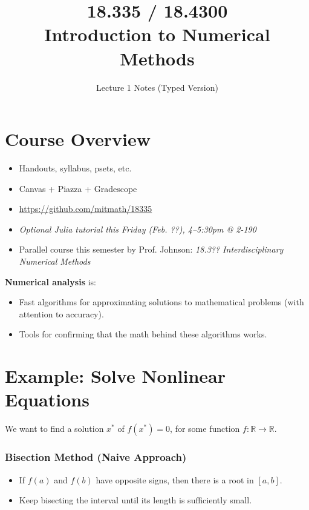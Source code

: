 \documentclass[12pt]{article}
\begin{document}
\title{18.335 / 18.4300 \\ Introduction to Numerical Methods}
\author{Lecture 1 Notes (Typed Version)}
\date{}
\maketitle

\section*{Course Overview}
\begin{itemize}
    \item Handouts, syllabus, psets, etc.
    \item Canvas + Piazza + Gradescope
    \item \url{https://github.com/mitmath/18335}
    \item \textit{Optional Julia tutorial this Friday (Feb. ??), 4--5:30pm @ 2-190}
    \item Parallel course this semester by Prof. Johnson: \textit{18.3?? Interdisciplinary Numerical Methods}
\end{itemize}

\noindent
\textbf{Numerical analysis} is:
\begin{itemize}
    \item Fast algorithms for approximating solutions to mathematical problems (with attention to accuracy).
    \item Tools for confirming that the math behind these algorithms works.
\end{itemize}

\section*{Example: Solve Nonlinear Equations}
We want to find a solution $x^*$ of $f(x^*) = 0$, for some function $f: \mathbb{R} \to \mathbb{R}$.

\subsubsection*{Bisection Method (Naive Approach)}
\begin{itemize}
    \item If $f(a)$ and $f(b)$ have opposite signs, then there is a root in $[a, b]$.
    \item Keep bisecting the interval until its length is sufficiently small.
\end{itemize}
\end{document}
